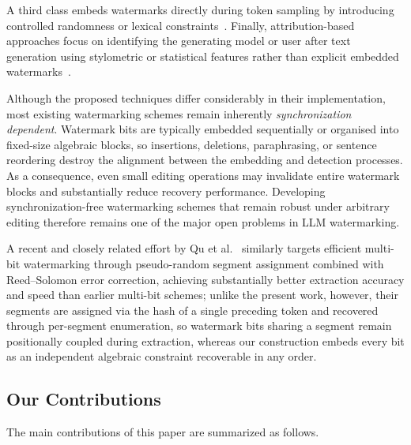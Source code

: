 \documentclass[a4paper,11pt]{llncs}
\begin{document}
A third class embeds watermarks directly during token sampling by introducing controlled randomness or lexical constraints~\cite{Xu_2024,Zhu_2024}. Finally, attribution-based approaches focus on identifying the generating model or user after text generation using stylometric or statistical features rather than explicit embedded watermarks~\cite{Niess_2025,Zhao_2023}.

Although the proposed techniques differ considerably in their implementation, most existing watermarking schemes remain inherently \emph{synchronization dependent}. Watermark bits are typically embedded sequentially or organised into fixed-size algebraic blocks, so insertions, deletions, paraphrasing, or sentence reordering destroy the alignment between the embedding and detection processes. As a consequence, even small editing operations may invalidate entire watermark blocks and substantially reduce recovery performance. Developing synchronization-free watermarking schemes that remain robust under arbitrary editing therefore remains one of the major open problems in LLM watermarking.

A recent and closely related effort by Qu et al.~\cite{qu2024provably} similarly targets
efficient multi-bit watermarking through pseudo-random segment assignment combined with
Reed--Solomon error correction, achieving substantially better extraction accuracy and
speed than earlier multi-bit schemes; unlike the present work, however, their segments are
assigned via the hash of a single preceding token and recovered through per-segment
enumeration, so watermark bits sharing a segment remain positionally coupled during
extraction, whereas our construction embeds every bit as an independent algebraic
constraint recoverable in any order.

\subsection{Our Contributions}

The main contributions of this paper are summarized as follows.
\end{document}
